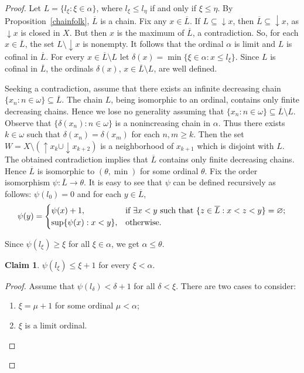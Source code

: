 \documentclass[12pt, twoside, leqno]{article}
\theoremstyle{definition}
\newtheorem{claim}[theorem]{Claim}
\numberwithin{equation}{section}
\newcommand{\w}{\omega}
\begin{document}
\begin{proof}
Let $L=\{l_\xi:\xi\in\alpha\}$, where $l_\xi\leq l_{\eta}$ if and only if $\xi\leq \eta$. By Proposition~\ref{chainfolk}, $\overline{L}$ is a chain.  Fix any $x\in\overline{L}$. If $L\subseteq {\downarrow}x$, then $\overline{L}\subseteq {\downarrow}x$, as ${\downarrow}x$ is closed in $X$. But then $x$ is the maximum of $\overline{L}$, a contradiction. So, for each $x\in\overline{L}$, the set $L\setminus {\downarrow}x$ is nonempty. It follows that the ordinal $\alpha$ is limit and $L$ is cofinal in $\overline{L}$.
For every $x\in \overline{L}\setminus L$ let $\delta(x)=\min\{\xi\in\alpha: x\leq l_\xi\}$. Since $L$ is cofinal in $\overline{L}$, the ordinals $\delta(x)$, $x\in \overline{L}\setminus L$, are well defined. 

Seeking a contradiction, assume that there exists an infinite decreasing chain $\{x_n:n\in\w\}\subseteq \overline{L}$. The chain $L$, being isomorphic to an ordinal, contains only finite decreasing chains. Hence we lose no generality assuming that $\{x_n:n\in\w\}\subseteq \overline{L}\setminus L$. Observe that $\{\delta(x_n):n\in\w\}$ is a nonincreasing chain in $\alpha$. Thus there exists $k\in\w$ such that $\delta(x_n)=\delta(x_m)$ for each $n,m\geq k$. Then the set $W=X\setminus ({\uparrow}x_k\cup {\downarrow}x_{k+2})$ is a neighborhood of $x_{k+1}$ which is disjoint with $L$. The obtained contradiction implies that $\overline{L}$ contains only finite decreasing chains. Hence $\overline{L}$ is isomorphic to $(\theta,\min)$ for some ordinal $\theta$. Fix the order isomorphism $\psi:\overline{L}\rightarrow \theta$. It is easy to see that $\psi$ can be defined  recursively as follows: $\psi(l_0)=0$ and for each $y\in\overline{L}$,
$$\psi(y)=
\begin{cases}
 \psi(x)+1, & \hbox{if }\exists x<y \hbox{ such that } \{z\in \overline L: x<z<y\}=\varnothing;\\
 \sup\{\psi(x):x< y\}, & \hbox{otherwise}.
\end{cases}
$$

Since $\psi(l_\xi)\geq \xi$ for all $\xi\in\alpha$, we get $\alpha\leq \theta$. 


\begin{claim}\label{claimineq}
$\psi(l_{\xi})\leq \xi+1$ for every $\xi<\alpha$.    
\end{claim}

\begin{proof}
Assume that $\psi(l_\delta)<\delta+1$ for all $\delta<\xi$. There are two cases to consider:
\begin{enumerate}[label=(\roman*)]
    \item $\xi=\mu+1$ for some ordinal $\mu<\alpha$;
    \item $\xi$ is a limit ordinal.
\end{enumerate}


\end{proof}
\end{proof}
\end{document}
